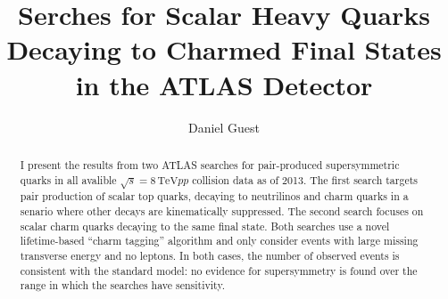 \documentclass{report}
\title{Serches for Scalar Heavy Quarks Decaying to Charmed Final States in the ATLAS Detector}
\author{Daniel Guest}
\newcommand{\cmenergy}{\ensuremath{\sqrt{s} = 8\,\text{TeV}}\xspace}
\begin{document}
\maketitle
\tableofcontents

\begin{abstract}
I present the results from two ATLAS searches for pair-produced
supersymmetric quarks in all avalible \cmenergy $pp$ collision data as
of 2013. The first search targets pair production of scalar top quarks,
decaying to neutrilinos and charm quarks in a senario where other
decays are kinematically suppressed. The second search focuses
on scalar charm quarks decaying to the same final state. Both searches
use a novel lifetime-based ``charm tagging'' algorithm
and only consider events with large missing transverse
energy and no leptons. In both cases, the number of observed events is
consistent with the standard model: no evidence for supersymmetry is
found over the range in which the searches have sensitivity.
\end{abstract}




\end{document}
